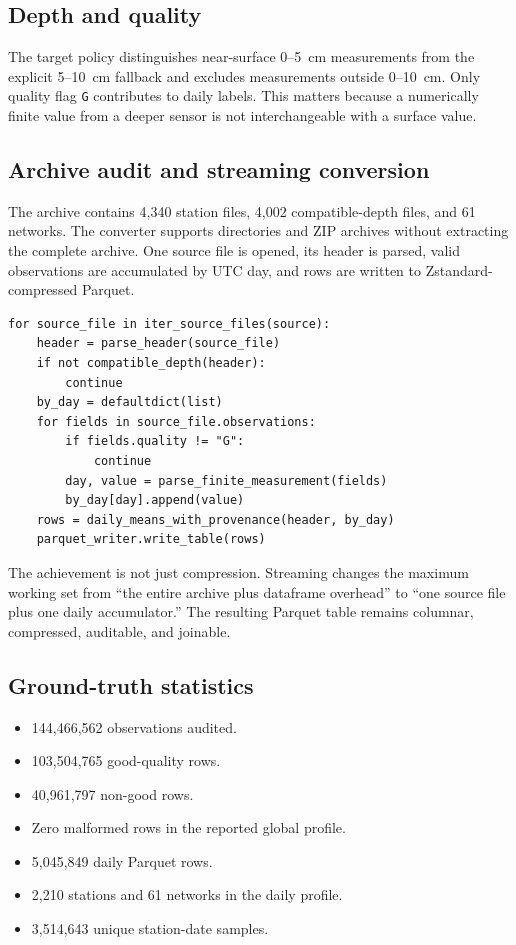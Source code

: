 \documentclass[12pt,a4paper]{report}
\newcommand{\feat}[1]{#1\par}
\begin{document}
\subsection{Depth and quality}
The target policy distinguishes near-surface 0--5~cm measurements from the
explicit 5--10~cm fallback and excludes measurements outside 0--10~cm. Only
quality flag \texttt{G} contributes to daily labels. This matters because a
numerically finite value from a deeper sensor is not interchangeable with a
surface value.

\subsection{Archive audit and streaming conversion}
The archive contains 4,340 station files, 4,002 compatible-depth files, and
61 networks. The converter supports directories and ZIP archives without
extracting the complete archive. One source file is opened, its header is
parsed, valid observations are accumulated by UTC day, and rows are written
to Zstandard-compressed Parquet.

\begin{lstlisting}[style=pycode, caption={Conceptual streaming reduction used by the global converter}]
for source_file in iter_source_files(source):
    header = parse_header(source_file)
    if not compatible_depth(header):
        continue
    by_day = defaultdict(list)
    for fields in source_file.observations:
        if fields.quality != "G":
            continue
        day, value = parse_finite_measurement(fields)
        by_day[day].append(value)
    rows = daily_means_with_provenance(header, by_day)
    parquet_writer.write_table(rows)
\end{lstlisting}

\feat{The achievement is not just compression. Streaming changes the maximum
working set from “the entire archive plus dataframe overhead” to “one source
file plus one daily accumulator.” The resulting Parquet table remains
columnar, compressed, auditable, and joinable.}

\subsection{Ground-truth statistics}
\begin{itemize}
    \item 144,466,562 observations audited.
    \item 103,504,765 good-quality rows.
    \item 40,961,797 non-good rows.
    \item Zero malformed rows in the reported global profile.
    \item 5,045,849 daily Parquet rows.
    \item 2,210 stations and 61 networks in the daily profile.
    \item 3,514,643 unique station-date samples.
\end{itemize}
\end{document}

